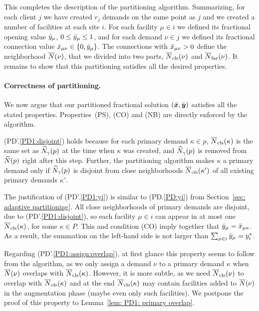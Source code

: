 This completes the description of the partitioning algorithm. Summarizing, for 
each client $j$ we have created $r_j$ demands on the same point as $j$ and
we created a number of facilities at each site $i$. 
For each facility $\mu\in i$ we defined its fractional opening value ${\bar y}_\mu$, $0\le {\bar y}_\mu\le 1$,
and for each demand $\nu\in j$ we defined its fractional connection value ${\bar x}_{\mu\nu}\in { \left\{ 0,{\bar y}_\mu \right\} }$.
The connections with ${\bar x}_{\mu\nu} > 0$ define the neighborhood ${\overline{N}}(\nu)$, that we divided into two parts,
${\overline{N}}_{\text{cls}}(\nu)$ and ${\overline{N}}_{\text{far}}(\nu)$. It remains to show that this partitioning
satisfies all the desired properties.


\medskip
\paragraph{Correctness of partitioning.}
We now argue that our partitioned fractional solution $(\bar{\boldsymbol{x}},\bar{\boldsymbol{y}})$
satisfies all the stated properties. Properties~(PS), (CO) and (NB) are
directly enforced by the algorithm.

(PD'.\ref{PD1:disjoint}) holds because for each primary demand $\kappa\in p$, 
${\overline{N}}_{\text{cls}}(\kappa)$ is the same set as ${\widetilde N}_{\gamma}(p)$ at the time when
$\kappa$ was created, and ${\widetilde N}_{\gamma}(p)$ is removed from ${\widetilde N}(p)$
right after this step. Further, the partitioning algorithm makes $\kappa$ a primary demand
only if ${\widetilde N}_{\gamma}(p)$ is disjoint from close neighborhoods
${\overline{N}}_{\text{cls}}(\kappa')$ of all existing primary demands $\kappa'$.

The justification of (PD'.\ref{PD1:yi}) is similar to (PD.\ref{PD:yi}) from
Section~\ref{sec: adaptive partitioning}. All close neighborhoods of
primary demands are disjoint, due to (PD'.\ref{PD1:disjoint}), so
each facility $\mu \in i$ can appear in at most one
${\overline{N}}_{\text{cls}}(\kappa)$, for some $\kappa\in P$. This and condition (CO) imply together
that ${\bar y}_{\mu} = {\bar x}_{\mu\kappa}$. As a result, the
summation on the left-hand side is not larger than 
$\sum_{\mu\in i}{\bar y}_{\mu} = y_i^\ast$. 

Regarding (PD'.\ref{PD1:assign:overlap}), at first glance this property seems
to follow from the algorithm, as we only assign a demand $\nu$ to a primary demand
$\kappa$ when ${\overline{N}}(\nu)$ overlaps with ${\overline{N}}_{\text{cls}}(\kappa)$. 
However, it is more subtle, as we need
${\overline{N}}_{\text{cls}}(\nu)$ to overlap with ${\overline{N}}_{\text{cls}}(\kappa)$ and
at the end ${\overline{N}}_{\text{cls}}(\kappa)$ may contain facilities added
to ${\overline{N}}(\nu)$ in the augmentation phase (maybe even only such facilities). We
postpone the proof of this property to Lemma~\ref{lem: PD1: primary overlap}.

